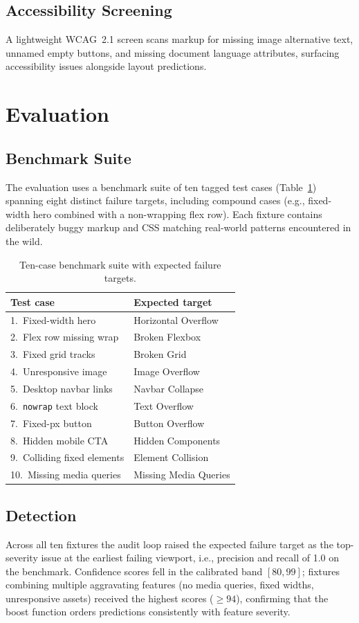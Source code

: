 \documentclass[conference]{IEEEtran}
\begin{document}
\subsection{Accessibility Screening}
A lightweight WCAG~2.1 screen \cite{wcag21} scans markup for missing
image alternative text, unnamed empty buttons, and missing document
language attributes, surfacing accessibility issues alongside layout
predictions.

\section{Evaluation}

\subsection{Benchmark Suite}
The evaluation uses a benchmark suite of ten tagged test cases
(Table~\ref{tab:bench}) spanning eight distinct failure targets,
including compound cases (e.g., fixed-width hero combined with a
non-wrapping flex row). Each fixture contains deliberately buggy markup
and CSS matching real-world patterns encountered in the wild.

\begin{table}[!t]
\caption{Ten-case benchmark suite with expected failure targets.}
\label{tab:bench}
\centering
\small
\begin{tabular}{@{}ll@{}}
\toprule
\textbf{Test case} & \textbf{Expected target} \\
\midrule
1.\ Fixed-width hero & Horizontal Overflow \\
2.\ Flex row missing wrap & Broken Flexbox \\
3.\ Fixed grid tracks & Broken Grid \\
4.\ Unresponsive image & Image Overflow \\
5.\ Desktop navbar links & Navbar Collapse \\
6.\ \texttt{nowrap} text block & Text Overflow \\
7.\ Fixed-px button & Button Overflow \\
8.\ Hidden mobile CTA & Hidden Components \\
9.\ Colliding fixed elements & Element Collision \\
10.\ Missing media queries & Missing Media Queries \\
\bottomrule
\end{tabular}
\end{table}

\subsection{Detection}
Across all ten fixtures the audit loop raised the expected failure
target as the top-severity issue at the earliest failing viewport, i.e.,
precision and recall of 1.0 on the benchmark. Confidence scores fell in
the calibrated band $[80, 99]$; fixtures combining multiple aggravating
features (no media queries, fixed widths, unresponsive assets) received
the highest scores ($\geq 94$), confirming that the boost function orders
predictions consistently with feature severity.
\end{document}
